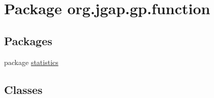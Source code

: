 \hypertarget{namespaceorg_1_1jgap_1_1gp_1_1function}{\section{Package org.\-jgap.\-gp.\-function}
\label{namespaceorg_1_1jgap_1_1gp_1_1function}
}
\subsection*{Packages}
\begin{DoxyCompactItemize}
\item 
package \hyperlink{namespaceorg_1_1jgap_1_1gp_1_1function_1_1statistics}{statistics}
\end{DoxyCompactItemize}
\subsection*{Classes}
